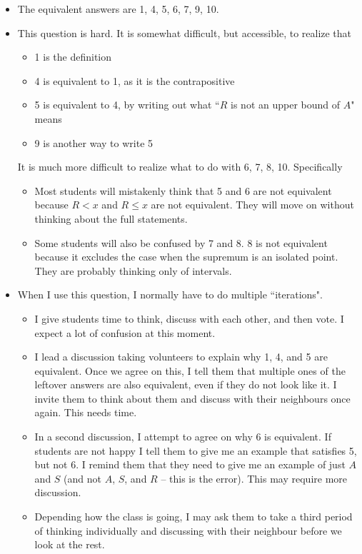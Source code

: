 \documentclass[11pt]{article}
\newcommand{\nl}{\hfill \vspace{-1.1\baselineskip}} %
\begin{document}
\begin{comments}
\nl
	\begin{itemize}
		\item The equivalent answers are 1, 4, 5, 6, 7, 9, 10.
		\item This question is hard. It is somewhat difficult, but accessible, to realize that
			\begin{itemize}
				\item 1 is the definition
				\item 4 is equivalent to 1, as it is the contrapositive
				\item 5 is equivalent to 4, by writing out what ``$R$ is not an upper bound of $A$" means
				\item 9 is another way to write 5
			\end{itemize}
			It is much more difficult to realize what to do with 6, 7, 8, 10.  Specifically
			\begin{itemize}
				\item  Most students will mistakenly think that 5 and 6 are not equivalent because $R<x$ and $R\leq x$ are not equivalent.  They will move on without thinking about the full statements. 
				\item Some students will also be confused by 7 and 8.  8 is not equivalent because it excludes the case when the supremum is an isolated point.  They are probably thinking only of intervals.
			\end{itemize}
		\item When I use this question, I normally have to do multiple ``iterations".
			\begin{itemize}
				\item  I give students time to think, discuss with each other, and then vote.  I expect a lot of confusion at this moment.
				\item I lead a discussion taking volunteers to explain why 1, 4, and 5 are equivalent.   Once we agree on this, I tell them that multiple ones of the leftover answers are also equivalent, even if they do not look like it.  I invite them to think about them and discuss with their neighbours once again. This needs time.
				\item In a second discussion, I attempt to agree on why 6 is equivalent.  If students are not happy I tell them to give me an example that satisfies 5, but not 6.  I remind them that they need to give me an example of just $A$ and $S$ (and not $A$, $S$, and $R$ -- this is the error).  This may require more discussion.
				\item  Depending how the class is going, I may ask them to take a third period of thinking individually and discussing with their neighbour before we look at the rest.
			\end{itemize}
	\end{itemize}
\end{comments}
\end{document}
